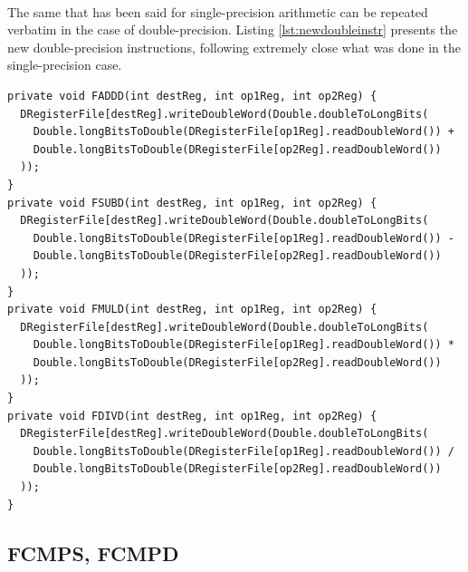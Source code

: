 \paragraph{}
The same that has been said for single-precision arithmetic can be repeated verbatim in the case of double-precision. Listing \ref{lst:newdoubleinstr} presents the new double-precision instructions, following extremely close what was done in the single-precision case.
\begin{lstlisting}[float, caption={New double-precision arithmetic instructions}, label={lst:newdoubleinstr}]
private void FADDD(int destReg, int op1Reg, int op2Reg) {
  DRegisterFile[destReg].writeDoubleWord(Double.doubleToLongBits(
    Double.longBitsToDouble(DRegisterFile[op1Reg].readDoubleWord()) +
    Double.longBitsToDouble(DRegisterFile[op2Reg].readDoubleWord())
  ));
}
private void FSUBD(int destReg, int op1Reg, int op2Reg) {
  DRegisterFile[destReg].writeDoubleWord(Double.doubleToLongBits(
    Double.longBitsToDouble(DRegisterFile[op1Reg].readDoubleWord()) -
    Double.longBitsToDouble(DRegisterFile[op2Reg].readDoubleWord())
  ));
}
private void FMULD(int destReg, int op1Reg, int op2Reg) {
  DRegisterFile[destReg].writeDoubleWord(Double.doubleToLongBits(
    Double.longBitsToDouble(DRegisterFile[op1Reg].readDoubleWord()) *
    Double.longBitsToDouble(DRegisterFile[op2Reg].readDoubleWord())
  ));
}
private void FDIVD(int destReg, int op1Reg, int op2Reg) {
  DRegisterFile[destReg].writeDoubleWord(Double.doubleToLongBits(
    Double.longBitsToDouble(DRegisterFile[op1Reg].readDoubleWord()) /
    Double.longBitsToDouble(DRegisterFile[op2Reg].readDoubleWord())
  ));
}
\end{lstlisting}
\subsection{FCMPS, FCMPD}
